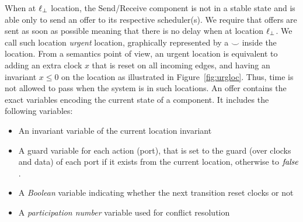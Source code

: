 When at $\ell_{\perp}$ location, the Send/Receive component is not in a stable state and is able only
to send an offer to its respective scheduler(s). We require that offers are sent as soon as 
possible meaning that there is no delay when at location $\ell_{\perp}$. We call such location
\emph{urgent} location, graphically represented by a $\smile$ inside the location. 
From a semantics point of view, an urgent location is equivalent to adding an extra clock
$x$ that is reset on all incoming edges, and having an invariant $x\le0$ on the location 
as illustrated in Figure~\ref{fig:urgloc}. Thus, time is not allowed to pass when the system 
is in such locations.  
An offer contains the exact variables encoding the current state of a component. It includes
the following variables:
\begin{itemize}
  \item An invariant variable of the current location invariant 
  \item A guard variable for each action (port), that is set to the guard (over clocks and data)
    of each port if it exists from the current location, otherwise to $\textnormal{\textit{false}}$.
  \item A \emph{Boolean} variable indicating whether the next transition reset clocks or not 
  \item A \emph{participation number} variable used for conflict resolution
\end{itemize}


